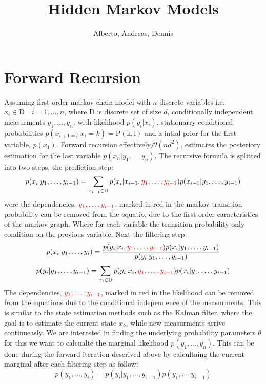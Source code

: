 \documentclass[10pt,a4paper]{article}
\author{Alberto, Andreas, Dennis}
\title{Hidden Markov Models}
\begin{document}
\maketitle

\section{Forward Recursion}
Assuming first order markov chain model with $n$ discrete variables i.e. $x_i \in \mathrm{D} \quad i = 1,\dots,n$, where $\mathrm{D}$ is discrete set of size $d$, conditionally independent measurments $y_1,\dots,y_n$, with likelihood $p(y_i|x_i)$, stationarry conditional probabilities $p(x_{i+1 = l}|x_i=k) = \mathrm{P(k,l)}$ and a intial prior for the first variable, $p(x_1)$.  %
Forward recursion effectively,$\mathcal{O}(nd^2)$, estimates the posteriory estimation for the last variable $p(x_n|y_1,\dots,y_n)$.
The recursive formula is splitted into two steps, the prediction step:
\begin{equation}\label{eq:predicted}
p(x_i|y_1,\dots,y_{i-1}) = \sum_{x_{i-1} \in \mathrm{D}}p(x_i|x_{i-1},{\color{red}y_{1},\dots,y_{i-1}})p(x_{i-1}|y_1,\dots,y_{i-1})
\end{equation}
were the dependencies, ${\color{red}y_{1},\dots,y_{i-1}}$, marked in red in the markov transition probability can be removed from the equatio, due to the first order caracteristics of the markov graph. Where for each variable the transition probability only condition on the previous variable. Next the filtering step:
\begin{equation}\label{eq:filtering}
p(x_i|y_1,\dots, y_i) = \frac{p(y_i|x_i,{\color{red}y_{1},\dots,y_{i-1}})p(x_i|y_1,\dots,y_{i-1})}{p(y_i|y_1,\dots,y_{i-1})}
\end{equation}
\begin{equation}
p(y_i|y_1,\dots,y_{i-1}) = \sum_{x_i\in\mathrm{D}} p(y_i|x_i,{\color{red}y_{1},\dots,y_{i-1}}) p(x_i|y_1,\dots,y_{i-1})
\end{equation}
The dependencies, ${\color{red}y_{1},\dots,y_{i-1}}$, marked in red in the likelihood can be removed from the equations due to the conditional independence of the measurments.  
This is similar to the state estimation methods such as the Kalman filter, where the goal is to estimate the current state $x_k$, while new measurments arrive continueasly.
We are interested in finding the underlying probability parameters $\theta$ for this we want to calcualte the marginal likelihood $p(y_1,\dots,y_n)$.
This can be done during the forward iteration descrived above by calcultaing the current marginal after each filtering step as follow: 
\begin{equation}
p(y_1,\dots,y_i) = p(y_i|y_1,\dots,y_{i-1})p(y_1,\dots,y_{i-1})
\end{equation}
\end{document}
